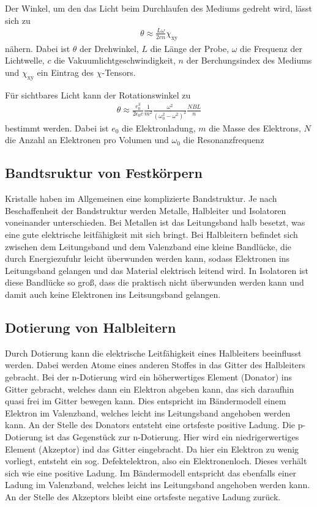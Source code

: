 Der Winkel, um den das Licht beim Durchlaufen des Mediums gedreht wird, lässt sich zu
\begin{align}
  \theta \approx \frac{L \omega}{2 c n}\chi_{\mathrm{xy}}
  \label{eqn:theta1}
\end{align}
nähern. Dabei ist $\theta$ der Drehwinkel, $L$ die Länge der Probe, $\omega$ die Frequenz
der Lichtwelle, $c$ die Vakuumlichtgeschwindigkeit, $n$ der Berchungsindex des Mediums
und $\chi_{\mathrm{xy}}$ ein Eintrag des $\chi$-Tensors.

Für sichtbares Licht kann der Rotationswinkel zu
\begin{align}
  \theta \approx \frac{e^3_0}{2 \epsilon_0 c} \frac{1}{m^2}\frac{\omega^2}{(\omega^2_0 - \omega^2)^2} \frac{NBL}{n}
  \label{eqn:theta2}
\end{align}
bestimmt werden. Dabei ist $e_0$ die Elektronladung, $m$ die Masse des Elektrons, $N$
die Anzahl an Elektronen pro Volumen und $\omega_0$ die Resonanzfrequenz


\subsection{Bandtsruktur von Festkörpern}
\label{subsec:bandstruktur}

Kristalle haben im Allgemeinen eine komplizierte Bandstruktur. Je nach Beschaffenheit
der Bandstruktur werden Metalle, Halbleiter und Isolatoren voneinander unterschieden.
Bei Metallen ist das Leitungsband halb besetzt, was eine gute elektrische leitfähigkeit
mit sich bringt. Bei Halbleitern befindet sich zwischen dem Leitungsband und dem
Valenzband eine kleine Bandlücke, die durch Energiezufuhr leicht überwunden
werden kann, sodass Elektronen ins Leitungsband gelangen und das Material elektrisch
leitend wird. In Isolatoren ist diese Bandlücke so groß, dass die praktisch nicht
überwunden werden kann und damit auch keine Elektronen ins Leitsungsband gelangen.


\subsection{Dotierung von Halbleitern}
\label{subsec:dotierung}
Durch Dotierung kann die elektrische Leitfähigkeit eines Halbleiters beeinflusst werden.
Dabei werden Atome eines anderen Stoffes in das Gitter des Halbleiters gebracht.
Bei der n-Dotierung wird ein höherwertiges Element (Donator) ins Gitter gebracht, welches
dann ein Elektron abgeben kann, das sich daraufhin quasi frei im Gitter bewegen kann.
Dies entspricht im Bändermodell einem Elektron im Valenzband, welches leicht
ins Leitungsband angehoben werden kann. An der Stelle
des Donators entsteht eine ortsfeste positive Ladung.
Die p-Dotierung ist das Gegenstück zur n-Dotierung. Hier wird ein niedrigerwertiges
Element (Akzeptor) ind das Gitter eingebracht. Da hier ein Elektron zu wenig vorliegt,
entsteht ein sog. Defektelektron, also ein Elektronenloch. Dieses verhält sich
wie eine positive Ladung. Im Bändermodell entspricht das ebenfalls einer Ladung
im Valenzband, welches leicht ins Leitungsband angehoben werden kann. An der Stelle
des Akzeptors bleibt eine ortsfeste negative Ladung zurück.

